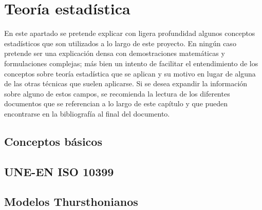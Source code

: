 \documentclass[11pt,a4paper,twoside]{book}
\author{Víctor de Tejada Molera}
\begin{document}
\chapter{Teoría estadística}
    En este apartado se pretende explicar con ligera profundidad algunos conceptos estadísticos que son utilizados a lo largo de este proyecto. En ningún caso pretende ser una explicación densa con demostraciones matemáticas y formulaciones complejas; más bien un intento de facilitar el entendimiento de los conceptos sobre teoría estadística que se aplican y su motivo en lugar de alguna de las otras técnicas que suelen aplicarse. Si se desea expandir la información sobre alguno de estos campos, se recomienda la lectura de los diferentes documentos que se referencian a lo largo de este capítulo y que pueden encontrarse en la bibliografía al final del documento.
    
    \section{Conceptos básicos}
        
    
    \section{UNE-EN ISO 10399}
    
    \section{Modelos Thursthonianos}
    
\end{document}
